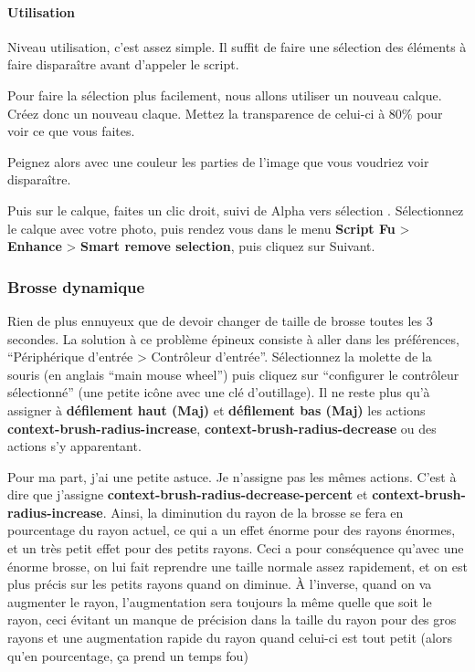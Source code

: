 \documentclass[a4paper,twoside]{article}
\begin{document}
\paragraph{Utilisation}
Niveau utilisation, c'est assez simple. Il suffit de faire une sélection des éléments à faire disparaître avant d'appeler le script.

Pour faire la sélection plus facilement, nous allons utiliser un nouveau calque. Créez donc un nouveau claque. Mettez la transparence de celui-ci à 80\% pour voir ce que vous faites.

Peignez alors avec une couleur les parties de l'image que vous voudriez voir disparaître.

Puis sur le calque, faites un clic droit, suivi de \og Alpha vers sélection \fg. Sélectionnez le calque avec votre photo, puis rendez vous dans le menu \textbf{Script Fu} > \textbf{Enhance} > \textbf{Smart remove selection}, puis cliquez sur Suivant.

\subsubsection{Brosse dynamique}
Rien de plus ennuyeux que de devoir changer de taille de brosse toutes les 3 secondes. La solution à ce problème épineux consiste à aller dans les préférences, ``Périphérique d'entrée > Contrôleur d'entrée''. Sélectionnez la molette de la souris (en anglais ``main mouse wheel'') puis cliquez sur ``configurer le contrôleur sélectionné'' (une petite icône avec une clé d'outillage). Il ne reste plus qu'à assigner à \textbf{défilement haut (Maj)} et \textbf{défilement bas (Maj)} les actions \textbf{context-brush-radius-increase}, \textbf{context-brush-radius-decrease} ou des actions s'y apparentant.

\begin{remarque}
Pour ma part, j'ai une petite astuce. Je n'assigne pas les mêmes actions. C'est à dire que j'assigne \textbf{context-brush-radius-decrease-percent} et \textbf{context-brush-radius-increase}. Ainsi, la diminution du rayon de la brosse se fera en pourcentage du rayon actuel, ce qui a un effet énorme pour des rayons énormes, et un très petit effet pour des petits rayons. Ceci a pour conséquence qu'avec une énorme brosse, on lui fait reprendre une taille normale assez rapidement, et on est plus précis sur les petits rayons quand on diminue. À l'inverse, quand on va augmenter le rayon, l'augmentation sera toujours la même quelle que soit le rayon, ceci évitant un manque de précision dans la taille du rayon pour des gros rayons et une augmentation rapide du rayon quand celui-ci est tout petit (alors qu'en pourcentage, ça prend un temps fou)
\end{remarque}
\end{document}
